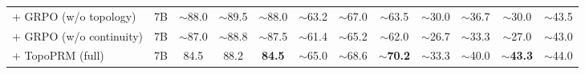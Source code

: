 \begin{table}[!htb]
{\begin{tabular}{l c ccc ccc ccc c}
+ GRPO (w/o topology)     & 7B & {$\sim$88.0} & {$\sim$89.5} & {$\sim$88.0} & {$\sim$63.2} & {$\sim$67.0} & {$\sim$63.5} & {$\sim$30.0} & {$\sim$36.7} & {$\sim$30.0} & {$\sim$43.5} \\
+ GRPO (w/o continuity)   & 7B & {$\sim$87.0} & {$\sim$88.8} & {$\sim$87.5} & {$\sim$61.4} & {$\sim$65.2} & {$\sim$62.0} & {$\sim$26.7} & {$\sim$33.3} & {$\sim$27.0} & {$\sim$43.0} \\
\rowcolor{blue!5}
+ TopoPRM (full)          & 7B & 84.5 & 88.2 & \textbf{84.5} & {$\sim$65.0} & {$\sim$68.6} & \textbf{{$\sim$70.2}} & {$\sim$33.3} & {$\sim$40.0} & \textbf{{$\sim$43.3}} & {$\sim$44.0} \\
\bottomrule
\end{tabular}%
}
\end{table}
